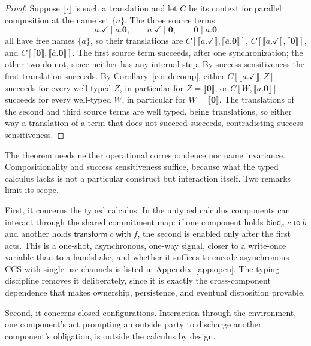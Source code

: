 \documentclass[11pt,openany]{book}
\theoremstyle{remark}
\begin{document}
\begin{proof}
Suppose $\llbracket\cdot\rrbracket$ is such a translation and let $C$ be
its context for parallel composition at the name set $\{a\}$. The three
source terms
\[
a.\checkmark\mid\bar a.\mathbf 0,\qquad
a.\checkmark\mid\mathbf 0,\qquad
\mathbf 0\mid\bar a.\mathbf 0
\]
all have free names $\{a\}$, so their translations are
$C[\llbracket a.\checkmark\rrbracket,\llbracket\bar a.\mathbf 0\rrbracket]$,
$C[\llbracket a.\checkmark\rrbracket,\llbracket\mathbf 0\rrbracket]$, and
$C[\llbracket\mathbf 0\rrbracket,\llbracket\bar a.\mathbf 0\rrbracket]$. The
first source term succeeds, after one synchronization; the other two do
not, since neither has any internal step. By success sensitiveness the
first translation succeeds. By Corollary~\ref{cor:decomp}, either
$C[\llbracket a.\checkmark\rrbracket,Z]$ succeeds for every well-typed
$Z$, in particular for $Z=\llbracket\mathbf 0\rrbracket$, or
$C[W,\llbracket\bar a.\mathbf 0\rrbracket]$ succeeds for every well-typed
$W$, in particular for $W=\llbracket\mathbf 0\rrbracket$. The
translations of the second and third source terms are well typed, being
translations, so either way a translation of a term that does not succeed
succeeds, contradicting success sensitiveness.
\end{proof}

The theorem needs neither operational correspondence nor name invariance.
Compositionality and success sensitiveness suffice, because what the
typed calculus lacks is not a particular construct but interaction itself.
Two remarks limit its scope.

First, it concerns the typed calculus. In the untyped calculus components
can interact through the shared commitment map: if one component holds
$\mathsf{bind}_a\;c\;\mathsf{to}\;b$ and another holds
$\mathsf{transform}\;c\;\mathsf{with}\;f$, the second is enabled only after
the first acts. This is a one-shot, asynchronous, one-way signal, closer to
a write-once variable than to a handshake, and whether it suffices to
encode asynchronous CCS with single-use channels is listed in
Appendix~\ref{app:open}. The typing discipline removes it deliberately,
since it is exactly the cross-component dependence that makes ownership,
persistence, and eventual disposition provable.

Second, it concerns closed configurations. Interaction through the
environment, one component's act prompting an outside party to discharge
another component's obligation, is outside the calculus by design.
\end{document}
